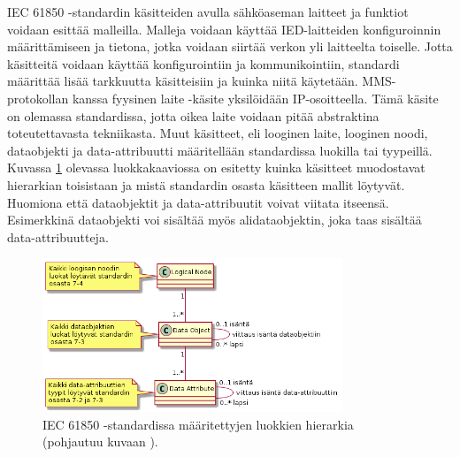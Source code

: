 IEC 61850 -standardin käsitteiden avulla sähköaseman laitteet ja funktiot voidaan esittää malleilla. Malleja voidaan käyttää IED-laitteiden konfiguroinnin määrittämiseen ja tietona, jotka voidaan siirtää verkon yli laitteelta toiselle. Jotta käsitteitä voidaan käyttää konfigurointiin ja kommunikointiin, standardi määrittää lisää tarkkuutta käsitteisiin ja kuinka niitä käytetään. MMS-protokollan kanssa fyysinen laite -käsite yksilöidään IP-osoitteella. Tämä käsite on olemassa standardissa, jotta oikea laite voidaan pitää abstraktina toteutettavasta tekniikasta. Muut käsitteet, eli looginen laite, looginen noodi, dataobjekti ja data-attribuutti määritellään standardissa luokilla tai tyypeillä. Kuvassa \ref{fig:iec61850-class-hierarchy} olevassa luokkakaaviossa on esitetty kuinka käsitteet muodostavat hierarkian toisistaan ja mistä standardin osasta käsitteen mallit löytyvät. Huomiona että dataobjektit ja data-attribuutit voivat viitata itseensä. Esimerkkinä dataobjekti voi sisältää myös alidataobjektin, joka taas sisältää data-attribuutteja. \mbox{\cite[s.~20--22]{IEC61850-7-2}}

\begin{figure}[ht!]
	\includegraphics[width=0.8\textwidth]{pictures/iec61850-class-hierarchy.png}
	\caption{IEC 61850 -standardissa määritettyjen luokkien hierarkia (pohjautuu kuvaan \mbox{\cite[s.~17]{IEC61850-7-2}}).}
	\label{fig:iec61850-class-hierarchy}
\end{figure}

